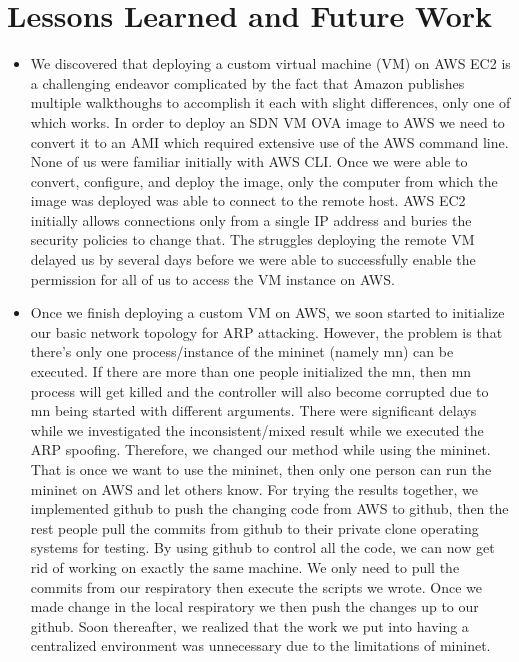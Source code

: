 \documentclass[conference]{IEEEtran}
\begin{document}
\section{Lessons Learned and Future Work}
\begin{itemize}
\item We discovered that deploying a custom virtual machine (VM) on AWS EC2 is a challenging endeavor complicated by the fact that Amazon publishes multiple walkthoughs to accomplish it each with slight differences, only one of which works. In order to deploy an SDN VM OVA image to AWS\cite{b7} we need to convert it to an AMI which required extensive use of the AWS command line. None of us were familiar initially with AWS CLI. Once we were able to convert, configure, and deploy the image, only the computer from which the image was deployed was able to connect to the remote host. AWS EC2 initially allows connections only from a single IP address and buries the security policies to change that. The struggles deploying the remote VM delayed us by several days before we were able to successfully enable the permission for all of us to access the VM instance on AWS.

\item Once we finish deploying a custom VM on AWS, we soon started to initialize our basic network topology for ARP attacking. However, the problem is that there's only one process/instance of the mininet (namely mn) can be executed. If there are more than one people initialized the mn, then mn process will get killed and the controller will also become corrupted due to mn being started with different arguments. There were significant delays while we investigated the inconsistent/mixed result while we executed the ARP spoofing. Therefore, we changed our method while using the mininet. That is once we want to use the mininet, then only one person can run the mininet on AWS and let others know. For trying the results together, we implemented github to push the changing code from AWS to github, then the rest people pull the commits from github to their private clone operating systems for testing. By using github to control all the code, we can now get rid of working on exactly the same machine. We only need to pull the commits from our respiratory then execute the scripts we wrote. Once we made change in the local respiratory we then push the changes up to our github. Soon thereafter, we realized that the work we put into having a centralized environment was unnecessary due to the limitations of mininet.


\end{itemize}
\end{document}
